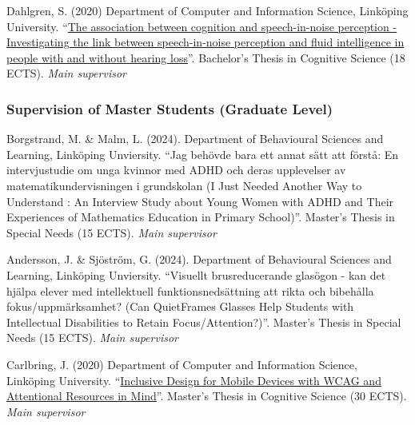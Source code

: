 \documentclass[]{article}
\begin{document}
Dahlgren, S. (2020) Department of Computer and Information Science,
Linköping University.
``\href{http://liu.diva-portal.org/smash/record.jsf?dswid=-6296&faces-redirect=true&language=en&searchType=SIMPLE&query=Marsja&af=\%5B\%5D&aq=\%5B\%5B\%5D\%5D&aq2=\%5B\%5B\%5D\%5D&aqe=\%5B\%5D&pid=diva2\%3A1443600&noOfRows=50&sortOrder=author_sort_asc&sortOrder2=title_sort_asc&onlyFullText=false&sf=undergraduate}{The
association between cognition and speech-in-noise perception -
Investigating the link between speech-in-noise perception and fluid
intelligence in people with and without hearing loss}''. Bachelor's
Thesis in Cognitive Science (18 ECTS). \emph{Main supervisor}

\subsubsection{Supervision of Master Students (Graduate
Level)}\label{supervision-of-master-students-graduate-level}

Borgstrand, M. \& Malm, L. (2024). Department of Behavioural Sciences
and Learning, Linköping Unviersity. ``Jag behövde bara ett annat sätt
att förstå: En intervjustudie om unga kvinnor med ADHD och deras
upplevelser av matematikundervisningen i grundskolan (I Just Needed
Another Way to Understand : An Interview Study about Young Women with
ADHD and Their Experiences of Mathematics Education in Primary
School)''. Master's Thesis in Special Needs (15 ECTS). \emph{Main
supervisor}

Andersson, J. \& Sjöström, G. (2024). Department of Behavioural Sciences
and Learning, Linköping Unviersity. ``Visuellt brusreducerande glasögon
- kan det hjälpa elever med intellektuell funktionsnedsättning att rikta
och bibehålla fokus/uppmärksamhet? (Can QuietFrames Glasses Help
Students with Intellectual Disabilities to Retain Focus/Attention?)''.
Master's Thesis in Special Needs (15 ECTS). \emph{Main supervisor}

Carlbring, J. (2020) Department of Computer and Information Science,
Linköping University.
``\href{http://liu.diva-portal.org/smash/record.jsf?dswid=-6296&faces-redirect=true&language=en&searchType=SIMPLE&query=Marsja&af=\%5B\%5D&aq=\%5B\%5B\%5D\%5D&aq2=\%5B\%5B\%5D\%5D&aqe=\%5B\%5D&pid=diva2\%3A1441358&noOfRows=50&sortOrder=author_sort_asc&sortOrder2=title_sort_asc&onlyFullText=false&sf=undergraduate}{Inclusive
Design for Mobile Devices with WCAG and Attentional Resources in
Mind}''. Master's Thesis in Cognitive Science (30 ECTS). \emph{Main
supervisor}
\end{document}

